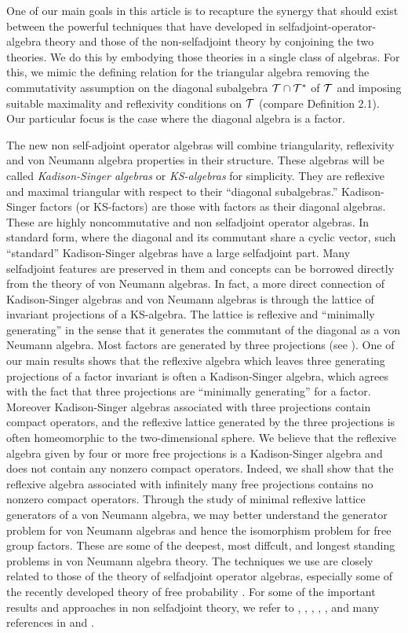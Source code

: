 One of our main goals in this article is to recapture the synergy
that should exist between the powerful techniques that have
developed in selfadjoint-operator-algebra theory and those of the
non-selfadjoint theory by conjoining the two theories.  We do this
by embodying those theories in a single class of algebras.  For
this, we mimic the defining relation for the triangular algebra
removing the commutativity assumption on the diagonal subalgebra
$\mathcal T\cap\mathcal T^*$ of $\mathcal T$ and imposing suitable maximality and
reflexivity conditions on $\mathcal T$ (compare Definition 2.1).  Our
particular focus is the case where the diagonal algebra is a factor.


The new non self-adjoint operator algebras will combine triangularity,
reflexivity and von Neumann algebra properties in their structure.
These algebras will be called {\it Kadison-Singer algebras} or {\it
KS-algebras} for simplicity. They are reflexive and maximal
triangular with respect to their ``diagonal subalgebras.''
Kadison-Singer factors (or KS-factors) are those with factors as
their diagonal algebras. These are highly noncommutative and non
selfadjoint operator algebras. In standard form, where the diagonal
and its commutant share a cyclic vector, such ``standard''
Kadison-Singer algebras have a large selfadjoint part. Many
selfadjoint features are preserved in them and concepts can be
borrowed directly from the theory of von Neumann algebras. In fact,
a more direct connection of Kadison-Singer algebras and von Neumann
algebras is through the lattice of invariant projections of a
KS-algebra. The lattice is reflexive and ``minimally generating'' in
the sense that it generates the commutant of the diagonal as a von
Neumann algebra. Most factors are generated by three projections
(see \cite{GS}). One of our main results shows that the reflexive algebra
which leaves three generating projections of a factor invariant is
often a Kadison-Singer algebra, which agrees with the fact that
three projections are ``minimally generating'' for a factor.
Moreover Kadison-Singer algebras associated with three projections
contain compact operators, and the reflexive lattice generated by
the three projections is often homeomorphic to the two-dimensional
sphere. We believe that the reflexive algebra given by four or more
free projections is a Kadison-Singer algebra and does not contain
any nonzero compact operators. Indeed, we shall show that the
reflexive algebra associated with infinitely many free projections
contains no nonzero compact operators. Through the study of minimal
reflexive lattice generators of a von Neumann algebra, we may better
understand the generator problem for von Neumann algebras and hence
the isomorphism problem for free group factors. These are some of
the deepest, most diffcult, and longest standing problems in von
Neumann algebra theory. The techniques we use are closely related to
those of the theory of selfadjoint operator algebras, especially
some of the recently developed theory of free probability \cite{VDN}. For
some of the important results and approaches in non selfadjoint
theory, we refer to \cite{R}, \cite{Ar}, \cite{L}, \cite{La2}, \cite{MSS}, 
\cite{DKP} and many
references in \cite{Da} and \cite{RR}.

